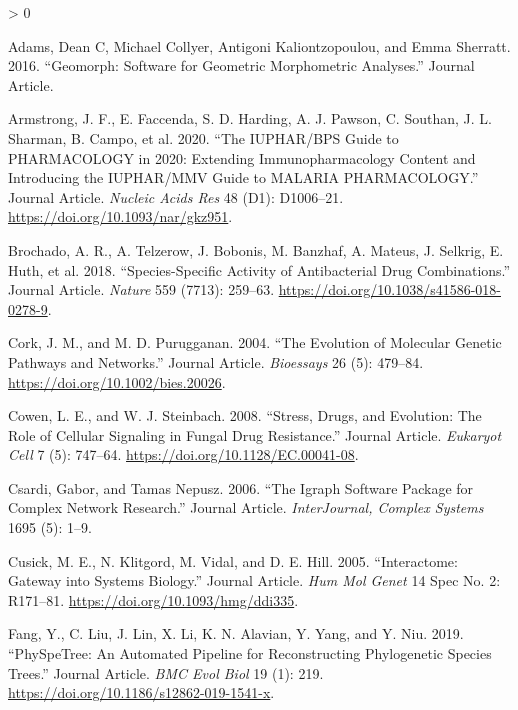 \documentclass[
]{article}
\newlength{\cslhangindent}
\newenvironment{CSLReferences}[2] %
 {%
  \setlength{\parindent}{0pt}
  \ifodd #1 \everypar{\setlength{\hangindent}{\cslhangindent}}\ignorespaces\fi
  \ifnum #2 > 0
  \setlength{\parskip}{#2\baselineskip}
  \fi
 }%
 {}
\begin{document}
\hypertarget{refs}{}
\begin{CSLReferences}{1}{0}
\leavevmode\hypertarget{ref-Adams2016}{}%
Adams, Dean C, Michael Collyer, Antigoni Kaliontzopoulou, and Emma Sherratt. 2016. {``Geomorph: Software for Geometric Morphometric Analyses.''} Journal Article.

\leavevmode\hypertarget{ref-Armstrong2020}{}%
Armstrong, J. F., E. Faccenda, S. D. Harding, A. J. Pawson, C. Southan, J. L. Sharman, B. Campo, et al. 2020. {``The IUPHAR/BPS Guide to PHARMACOLOGY in 2020: Extending Immunopharmacology Content and Introducing the IUPHAR/MMV Guide to MALARIA PHARMACOLOGY.''} Journal Article. \emph{Nucleic Acids Res} 48 (D1): D1006--21. \url{https://doi.org/10.1093/nar/gkz951}.

\leavevmode\hypertarget{ref-Brochado2018}{}%
Brochado, A. R., A. Telzerow, J. Bobonis, M. Banzhaf, A. Mateus, J. Selkrig, E. Huth, et al. 2018. {``Species-Specific Activity of Antibacterial Drug Combinations.''} Journal Article. \emph{Nature} 559 (7713): 259--63. \url{https://doi.org/10.1038/s41586-018-0278-9}.

\leavevmode\hypertarget{ref-Cork2004}{}%
Cork, J. M., and M. D. Purugganan. 2004. {``The Evolution of Molecular Genetic Pathways and Networks.''} Journal Article. \emph{Bioessays} 26 (5): 479--84. \url{https://doi.org/10.1002/bies.20026}.

\leavevmode\hypertarget{ref-Cowen2008}{}%
Cowen, L. E., and W. J. Steinbach. 2008. {``Stress, Drugs, and Evolution: The Role of Cellular Signaling in Fungal Drug Resistance.''} Journal Article. \emph{Eukaryot Cell} 7 (5): 747--64. \url{https://doi.org/10.1128/EC.00041-08}.

\leavevmode\hypertarget{ref-Csardi2016}{}%
Csardi, Gabor, and Tamas Nepusz. 2006. {``The Igraph Software Package for Complex Network Research.''} Journal Article. \emph{InterJournal, Complex Systems} 1695 (5): 1--9.

\leavevmode\hypertarget{ref-Cusick2005}{}%
Cusick, M. E., N. Klitgord, M. Vidal, and D. E. Hill. 2005. {``Interactome: Gateway into Systems Biology.''} Journal Article. \emph{Hum Mol Genet} 14 Spec No. 2: R171--81. \url{https://doi.org/10.1093/hmg/ddi335}.

\leavevmode\hypertarget{ref-Fang2019}{}%
Fang, Y., C. Liu, J. Lin, X. Li, K. N. Alavian, Y. Yang, and Y. Niu. 2019. {``PhySpeTree: An Automated Pipeline for Reconstructing Phylogenetic Species Trees.''} Journal Article. \emph{BMC Evol Biol} 19 (1): 219. \url{https://doi.org/10.1186/s12862-019-1541-x}.


\end{CSLReferences}
\end{document}
